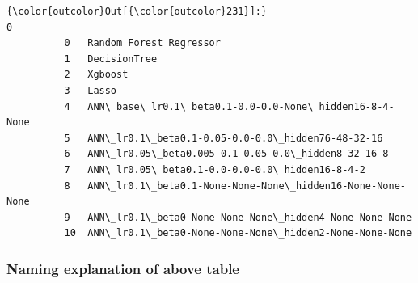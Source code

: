 \documentclass[11pt, a4paper , landscape]{article}
\begin{document}
\begin{Verbatim}[commandchars=\\\{\}]
{\color{outcolor}Out[{\color{outcolor}231}]:}                                                            0
          0   Random Forest Regressor                                 
          1   DecisionTree                                            
          2   Xgboost                                                 
          3   Lasso                                                   
          4   ANN\_base\_lr0.1\_beta0.1-0.0-0.0-None\_hidden16-8-4-None   
          5   ANN\_lr0.1\_beta0.1-0.05-0.0-0.0\_hidden76-48-32-16        
          6   ANN\_lr0.05\_beta0.005-0.1-0.05-0.0\_hidden8-32-16-8       
          7   ANN\_lr0.05\_beta0.1-0.0-0.0-0.0\_hidden16-8-4-2           
          8   ANN\_lr0.1\_beta0.1-None-None-None\_hidden16-None-None-None
          9   ANN\_lr0.1\_beta0-None-None-None\_hidden4-None-None-None   
          10  ANN\_lr0.1\_beta0-None-None-None\_hidden2-None-None-None   
\end{Verbatim}
            
    \subsubsection{Naming explanation of above
table}\label{naming-explanation-of-above-table}
\end{document}
